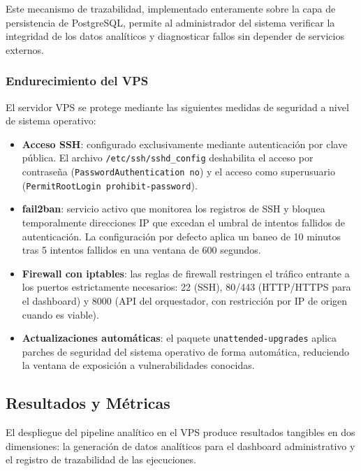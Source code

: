 Este mecanismo de trazabilidad, implementado enteramente sobre la capa
de persistencia de PostgreSQL, permite al administrador del sistema
verificar la integridad de los datos analíticos y diagnosticar fallos
sin depender de servicios externos.

\subsubsection{Endurecimiento del VPS}

El servidor VPS se protege mediante las siguientes medidas de seguridad
a nivel de sistema operativo:

\begin{itemize}[leftmargin=1.5em]
  \item \textbf{Acceso SSH}: configurado exclusivamente mediante
  autenticación por clave pública. El archivo
  \texttt{/etc/ssh/sshd\_config} deshabilita el acceso por contraseña
  (\texttt{PasswordAuthentication no}) y el acceso como superusuario
  (\texttt{PermitRootLogin prohibit-password}).
  \item \textbf{fail2ban}: servicio activo que monitorea los registros
  de SSH y bloquea temporalmente direcciones IP que excedan el umbral
  de intentos fallidos de autenticación. La configuración por defecto
  aplica un baneo de 10 minutos tras 5 intentos fallidos en una ventana
  de 600 segundos.
  \item \textbf{Firewall con iptables}: las reglas de firewall
  restringen el tráfico entrante a los puertos estrictamente
  necesarios: 22 (SSH), 80/443 (HTTP/HTTPS para el dashboard) y 8000
  (API del orquestador, con restricción por IP de origen cuando es
  viable).
  \item \textbf{Actualizaciones automáticas}: el paquete
  \texttt{unattended-upgrades} aplica parches de seguridad del sistema
  operativo de forma automática, reduciendo la ventana de exposición a
  vulnerabilidades conocidas.
\end{itemize}

\subsection{Resultados y Métricas}

El despliegue del pipeline analítico en el VPS produce resultados
tangibles en dos dimensiones: la generación de datos analíticos para el
dashboard administrativo y el registro de trazabilidad de las
ejecuciones.


